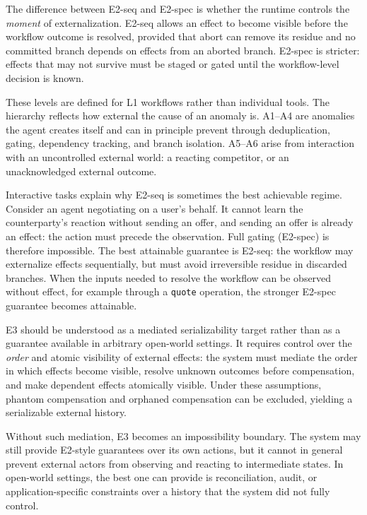\documentclass[11pt]{article}
\begin{document}
The difference between E2-seq and E2-spec is whether the runtime controls
the \emph{moment} of externalization. E2-seq allows an effect to become
visible before the workflow outcome is resolved, provided that abort can
remove its residue and no committed branch depends on effects from an
aborted branch. E2-spec is stricter: effects that may not survive must be
staged or gated until the workflow-level decision is known.

These levels are defined for L1 workflows rather than individual tools.
The hierarchy reflects how external the cause of an anomaly is. A1--A4 are
anomalies the agent creates itself and can in principle prevent through
deduplication, gating, dependency tracking, and branch isolation. A5--A6
arise from interaction with an uncontrolled external world: a reacting
competitor, or an unacknowledged external outcome.

Interactive tasks explain why E2-seq is sometimes the best achievable
regime. Consider an agent negotiating on a user's behalf. It cannot learn
the counterparty's reaction without sending an offer, and sending an offer
is already an effect: the action must precede the observation. Full gating
(E2-spec) is therefore impossible. The best attainable guarantee is
E2-seq: the workflow may externalize effects sequentially, but must avoid
irreversible residue in discarded branches. When the inputs needed to
resolve the workflow can be observed without effect, for example through a
\texttt{quote} operation, the stronger E2-spec guarantee becomes
attainable.

E3 should be understood as a mediated serializability target rather than
as a guarantee available in arbitrary open-world settings. It requires
control over the \emph{order} and atomic visibility of external effects:
the system must mediate the order in which effects become visible, resolve
unknown outcomes before compensation, and make dependent effects
atomically visible. Under these assumptions, phantom compensation and
orphaned compensation can be excluded, yielding a serializable external
history.

Without such mediation, E3 becomes an impossibility boundary. The system
may still provide E2-style guarantees over its own actions, but it cannot
in general prevent external actors from observing and reacting to
intermediate states. In open-world settings, the best one can provide is
reconciliation, audit, or application-specific constraints over a history
that the system did not fully control.
\end{document}
